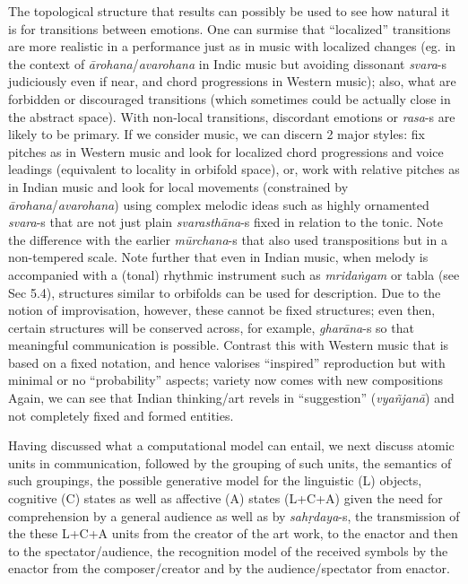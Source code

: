 The topological structure that results can possibly be used to see how natural it is for transitions between emotions. One can surmise that “localized” transitions are more realistic in a performance just as in music with localized changes (eg. in the context of \textsl{ārohana}/\textsl{avarohana} in Indic music but avoiding dissonant \textsl{svara}-s judiciously even if near, and chord progressions in Western music); also, what are forbidden or discouraged transitions (which sometimes could be actually close in the abstract space). With non-local transitions, discordant emotions or \textsl{rasa}-s are likely to be primary. If we consider music, we can discern 2 major styles: fix pitches as in Western music and look for localized chord progressions and voice leadings (equivalent to locality in orbifold space), or, work with relative pitches as in Indian music and look for local movements (constrained by \textsl{ārohana}/\textsl{avarohana}) using complex melodic ideas such as highly ornamented \textsl{svara}-s that are not just plain \textsl{svarasthāna}-s fixed in relation to the tonic. Note the difference with the earlier \textsl{mūrchana}-s that also used transpositions but in a non-tempered scale. Note further that even in Indian music, when melody is accompanied with a (tonal) rhythmic instrument such as \textsl{mridaṅgam} or tabla (see Sec 5.4), structures similar to orbifolds can be used for description. Due to the notion of improvisation, however, these cannot be fixed structures; even then, certain structures will be conserved across, for example, \textsl{gharāna}-s so that meaningful communication is possible. Contrast this with Western music that is based on a fixed notation, and hence valorises “inspired” reproduction but with minimal or no “probability” aspects; variety now comes with new compositions Again, we can see that Indian thinking/art revels in “suggestion” (\textsl{vyañjanā}) and not completely fixed and formed entities.

\newpage

Having discussed what a computational model can entail, we next discuss atomic units in communication, followed by the grouping of such units, the semantics of such groupings, the possible generative model for the linguistic (L) objects, cognitive (C) states as well as affective (A) states (L+C+A) given the need for comprehension by a general audience as well as by \textsl{sahṛdaya}-s, the transmission of the these L+C+A units from the creator of the art work, to the enactor and then to the spectator/audience, the recognition model of the received symbols by the enactor from the composer/creator and by the audience/spectator from enactor.

